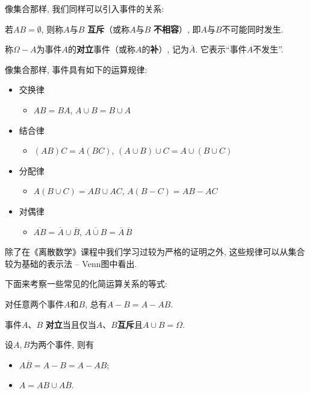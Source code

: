 像集合那样, 我们同样可以引入事件的关系:

\begin{definition}
    若$AB=\emptyset$, 则称$A$与$B$ \textbf{互斥}（或称$A$与$B$ \textbf{不相容}）, %
    即$A$与$B$不可能同时发生.
\end{definition}

\begin{definition}
    称$\Omega-A$为事件$A$的\textbf{对立}事件（或称$A$的\textbf{补}）, 记为$\overline{A}$.
    它表示``事件$A$不发生''.
\end{definition}


像集合那样, 事件具有如下的运算规律:
\begin{itemize}
    \item 交换律
          \begin{itemize}
              \item $AB=BA$, $A\cup B=B\cup A$
          \end{itemize}
    \item 结合律
          \begin{itemize}
              \item $(AB)C=A(BC)$, $(A\cup B)\cup C=A\cup(B\cup C)$
          \end{itemize}
    \item 分配律
          \begin{itemize}
              \item $A(B\cup C)=AB\cup AC$, $A(B-C)=AB-AC$
          \end{itemize}
    \item 对偶律
          \begin{itemize}
              \item $\overline{AB}=\overline{A}\cup\overline{B}$, $\overline{A\cup B}=\overline{A}\,\overline{B}$
          \end{itemize}
\end{itemize}
除了在《离散数学》课程中我们学习过较为严格的证明之外, 这些规律可以从集合较为基础的表示法 -- Venn图中看出. 

下面来考察一些常见的化简运算关系的等式:

\begin{proposition}
    对任意两个事件$A$和$B$, 总有$ A-B=A-AB$.
\end{proposition}


\begin{proposition}
    事件$A$、$B$ \textbf{对立}当且仅当$A$、$B$\textbf{互斥}且$A\cup B=\Omega$.
\end{proposition}
\begin{example}
    设$A,B$为两个事件, 则有
    \begin{itemize}
        \item $A\overline{B}=A-B=A-AB$;
        \item $A=AB\cup A\overline{B}$.
    \end{itemize}
\end{example}

